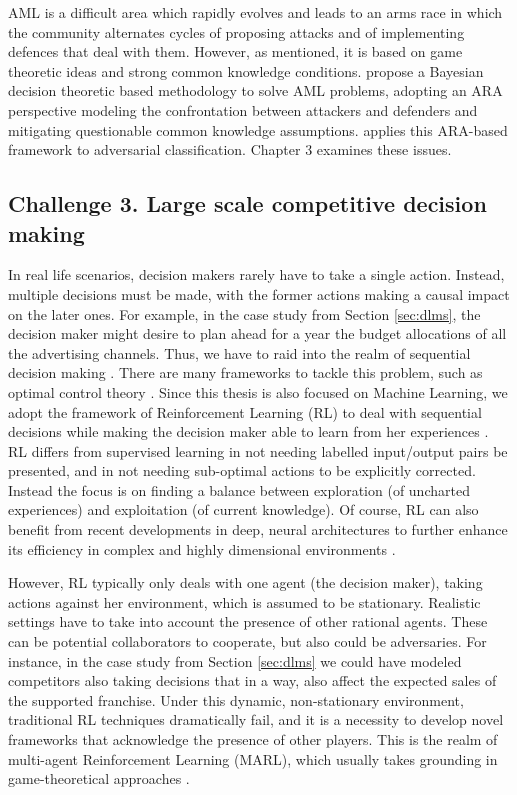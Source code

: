 AML is a  difficult area which rapidly evolves and leads to an 
arms race in which the community alternates cycles of proposing attacks and  of implementing defences that deal with them. However, as mentioned, it is 
based on game theoretic ideas and strong common
knowledge conditions. 
\parencite{AMLARA} propose a
Bayesian decision theoretic based methodology 
to solve AML problems, 
adopting an ARA perspective \parencite{adversarialRiskAnalysis2009,Banks} modeling the confrontation between attackers and defenders and mitigating questionable common knowledge assumptions. \parencite{math8111957} applies this ARA-based framework to  adversarial classification. Chapter 3 examines these issues.





\subsection{Challenge 3. Large scale competitive decision making}

In real life scenarios, decision makers rarely have to take a single action. Instead, multiple decisions must be made, with the former actions making a causal impact on the later ones. For example, in the case study from Section \ref{sec:dlms}, the decision maker might desire to plan ahead for a year the budget allocations of all the advertising channels. Thus, we have to raid into the realm of sequential decision making \parencite{french,DIEDERICH200113917}. There are many frameworks to tackle this problem, such as optimal control theory \parencite{kirk2004optimal}. Since this thesis is also focused on Machine Learning, we adopt the framework of Reinforcement Learning (RL) to deal with sequential decisions while making the decision maker able to learn from her experiences \parencite{sutton2012reinforcement,kaelbling1996reinforcement}. RL differs from supervised learning in not needing labelled input/output pairs be presented, and in not needing sub-optimal actions to be explicitly corrected. Instead the focus is on finding a balance between exploration (of uncharted experiences) and exploitation (of current knowledge). Of course, RL can also benefit from recent developments in deep, neural architectures to further enhance its efficiency in complex and highly dimensional environments \parencite{mnih2015human}.

However, RL typically only deals with one agent (the decision maker), taking actions against her environment, which is assumed to be stationary. Realistic settings have to take into account the presence of other rational agents. These can be potential collaborators to cooperate, but also could be adversaries. For instance, in the case study from Section \ref{sec:dlms} we could have modeled competitors also taking decisions that in a way, also affect the expected sales of the supported franchise. Under this dynamic, non-stationary environment, traditional RL techniques dramatically fail, and it is a necessity to develop novel frameworks that acknowledge the presence of other players. This is the realm of multi-agent Reinforcement Learning (MARL), which usually takes grounding in game-theoretical approaches \parencite{marl_over,lanctot2017unified}. 

